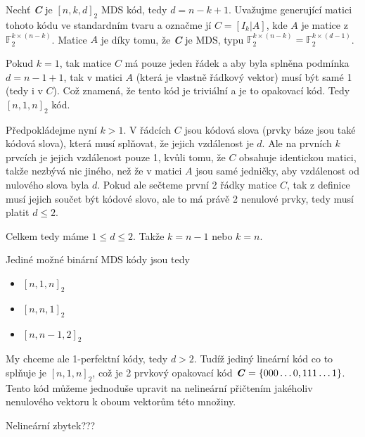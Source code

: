 \documentclass[12pt, a4paper]{article}
\begin{document}
\section{}
Nechť \textbf{\textit{C}} je $[n,k,d]_{2}$ MDS kód, tedy $d=n-k+1$. Uvažujme generující matici tohoto kódu ve standardním tvaru a označme jí $C = [I_{k}|A]$, kde $A$ je matice z $\mathbb{F}^{k \times (n-k)}_{2}$. Matice $A$ je díky tomu, že \textbf{\textit{C}} je MDS, typu $\mathbb{F}^{k \times (n-k)}_{2} = \mathbb{F}^{k \times (d-1)}_{2}$.



Pokud $k=1$, tak matice $C$ má pouze jeden řádek a aby byla splněna podmínka $d = n - 1 + 1$, tak v matici $A$ (která je vlastně řádkový vektor) musí být samé 1 (tedy i v $C$). Což znamená, že tento kód je triviální a je to opakovací kód. Tedy $[n,1,n]_{2}$ kód.

Předpokládejme nyní $k > 1$. V řádcích $C$ jsou kódová slova (prvky báze jsou také kódová slova), která musí splňovat, že jejich vzdálenost je $d$. Ale na prvních $k$ prvcích je jejich vzdálenost pouze 1, kvůli tomu, že $C$ obsahuje identickou matici, takže nezbývá nic jiného, než že v matici $A$ jsou samé jedničky, aby vzdálenost od nulového slova byla $d$. Pokud ale sečteme první 2 řádky matice $C$, tak z definice musí jejich součet být kódové slovo, ale to má právě 2 nenulové prvky, tedy musí platit $d \leq 2$.

Celkem tedy máme $1 \leq d \leq 2$. Takže $k = n-1$ nebo $k = n$. 

Jediné možné binární MDS kódy jsou tedy
\begin{itemize}
    \item $[n,1,n]_{2}$
    \item $[n,n,1]_{2}$
    \item $[n,n-1,2]_{2}$
\end{itemize}

My chceme ale 1-perfektní kódy, tedy $d > 2$. Tudíž jediný lineární kód co to splňuje je $[n,1,n]_{2}$, což je 2 prvkový opakovací kód $\textbf{\textit{C}}=\{000\dots0, 111\dots1\}$. Tento kód můžeme jednoduše upravit na nelineární přičtením jakéholiv nenulového vektoru k oboum vektorům této množiny.

Nelineární zbytek???
\end{document}
